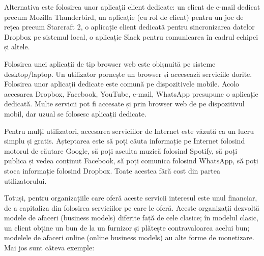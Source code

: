 Alternativa este folosirea unor aplicații client dedicate: un client de e-mail dedicat precum Mozilla Thunderbird, un aplicație (cu rol de client) pentru un joc de rețea precum Starcraft 2, o aplicație client dedicată pentru sincronizarea datelor Dropbox pe sistemul local, o aplicație Slack pentru comunicarea în cadrul echipei și altele.

Folosirea unei aplicații de tip browser web este obișnuită pe sisteme desktop/laptop. Un utilizator pornește un browser și accesează serviciile dorite. Folosirea unor aplicații dedicate este comună pe dispozitivele mobile. Acolo accesarea Dropbox, Facebook, YouTube, e-mail, WhatsApp presupune o aplicație dedicată. Multe servicii pot fi accesate și prin browser web de pe dispozitivul mobil, dar uzual se folosesc aplicații dedicate.

Pentru mulți utilizatori, accesarea serviciilor de Internet este văzută ca un lucru simplu și gratis. Așteptarea este să poți căuta informație pe Internet folosind motorul de căutare Google, să poți asculta muzică folosind Spotify, să poți publica și vedea conținut Facebook, să poți comunica folosind WhatsApp, să poți stoca informație folosind Dropbox. Toate acestea fără cost din partea utilizatorului.

Totuși, pentru organizațiile care oferă aceste servicii interesul este unul financiar, de a capitaliza din folosirea serviciilor pe care le oferă. Aceste organizații dezvoltă modele de afaceri (business models) diferite față de cele clasice; în modelul clasic, un client obține un bun de la un furnizor și plătește contravaloarea acelui bun; modelele de afaceri online (online business models) au alte forme de monetizare. Mai jos sunt câteva exemple:

